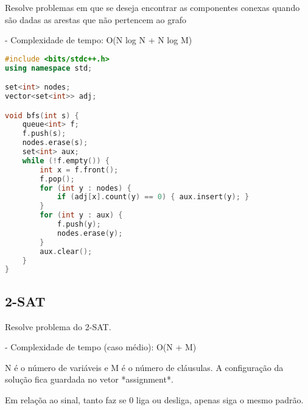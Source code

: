 \documentclass[11pt, a4paper, twoside]{article}
\begin{document}
Resolve problemas em que se deseja encontrar as componentes conexas quando são dadas as arestas que não pertencem ao grafo

- Complexidade de tempo: O(N log N + N log M)

\begin{lstlisting}[language=C++]
#include <bits/stdc++.h>
using namespace std;

set<int> nodes;
vector<set<int>> adj;

void bfs(int s) {
    queue<int> f;
    f.push(s);
    nodes.erase(s);
    set<int> aux;
    while (!f.empty()) {
        int x = f.front();
        f.pop();
        for (int y : nodes) {
            if (adj[x].count(y) == 0) { aux.insert(y); }
        }
        for (int y : aux) {
            f.push(y);
            nodes.erase(y);
        }
        aux.clear();
    }
}
\end{lstlisting}

\subsection{2-SAT  }



Resolve problema do 2-SAT.

- Complexidade de tempo (caso médio): O(N + M)  

N é o número de variáveis e M é o número de cláusulas.  
A configuração da solução fica guardada no vetor *assignment*. 

Em relaçõa ao sinal, tanto faz se 0 liga ou desliga, apenas siga o mesmo padrão.
\end{document}

